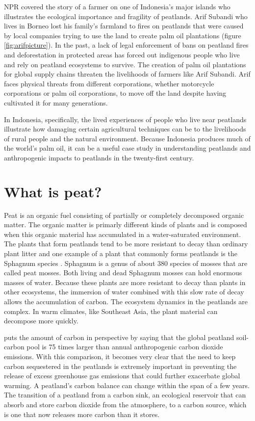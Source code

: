 NPR covered the story of a farmer on one of Indonesia's major islands who illustrates the ecological importance and fragility of peatlands. Arif Subandi who lives in Borneo lost his family's farmland to fires on peatlands that were caused by local companies trying to use the land to create palm oil plantations (figure \ref{fig:arifpicture}). In the past, a lack of legal enforcement of bans on peatland fires and deforestation in protected areas has forced out indigenous people who live and rely on peatland ecosystems to survive. The creation of palm oil plantations for global supply chains threaten the livelihoods of farmers like Arif Subandi. Arif faces physical threats from different corporations, whether motorcycle corporations or palm oil corporations, to move off the land despite having cultivated it for many generations. 

In Indonesia, specifically, the lived experiences of people who live near peatlands illustrate how damaging certain agricultural techniques can be to the livelihoods of rural people and the natural environment. Because Indonesia produces much of the world's palm oil, it can be a useful case study in understanding peatlands and anthropogenic impacts to peatlands in the twenty-first century. 

\section{What is peat?}

Peat is an organic fuel consisting of partially or completely decomposed organic matter. The organic matter is primarly different kinds of plants and is composed when this organic material has accumulated in a water-saturated environment. The plants that form peatlands tend to be more resistant to decay than ordinary plant litter and one example of a plant that commonly forms peatlands is the Sphagnum species \citep{holden2005peatland}. Sphagnum is a genus of about 380 species of mosses that are called peat mosses. Both living and dead Sphagnum mosses can hold enormous masses of water. Because these plants are more resistant to decay than plants in other ecosystems, the immersion of water combined with this slow rate of decay allows the accumulation of carbon. The ecosystem dynamics in the peatlands are complex. In warm climates, like Southeast Asia, the plant material can decompose more quickly. 

\citet{bridgham2008rapid} puts the amount of carbon in perspective by saying that the global peatland soil-carbon pool is 75 times larger than annual anthropogenic carbon dioxide emissions. With this comparison, it becomes very clear that the need to keep carbon sequestered in the peatlands is extremely important in preventing the release of excess greenhouse gas emissions that could further exacerbate global warming. A peatland's carbon balance can change within the span of a few years. The transition of a peatland from a carbon sink, an ecological reservoir that can absorb and store carbon dioxide from the atmosphere, to a carbon source, which is one that now releases more carbon than it stores.  

